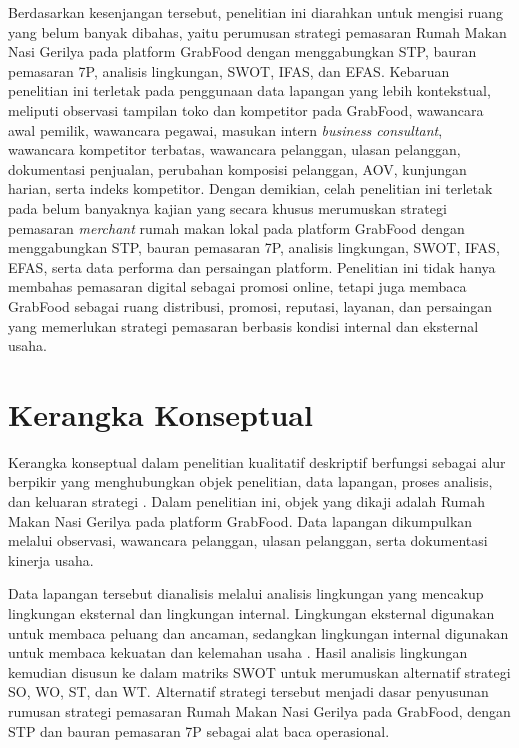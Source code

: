 Berdasarkan kesenjangan tersebut, penelitian ini diarahkan untuk mengisi ruang yang belum banyak dibahas, yaitu perumusan strategi pemasaran Rumah Makan Nasi Gerilya pada platform GrabFood dengan menggabungkan STP, bauran pemasaran 7P, analisis lingkungan, SWOT, IFAS, dan EFAS. Kebaruan penelitian ini terletak pada penggunaan data lapangan yang lebih kontekstual, meliputi observasi tampilan toko dan kompetitor pada GrabFood, wawancara awal pemilik, wawancara pegawai, masukan intern \textit{business consultant}, wawancara kompetitor terbatas, wawancara pelanggan, ulasan pelanggan, dokumentasi penjualan, perubahan komposisi pelanggan, AOV, kunjungan harian, serta indeks kompetitor. Dengan demikian, celah penelitian ini terletak pada belum banyaknya kajian yang secara khusus merumuskan strategi pemasaran \textit{merchant} rumah makan lokal pada platform GrabFood dengan menggabungkan STP, bauran pemasaran 7P, analisis lingkungan, SWOT, IFAS, EFAS, serta data performa dan persaingan platform. Penelitian ini tidak hanya membahas pemasaran digital sebagai promosi online, tetapi juga membaca GrabFood sebagai ruang distribusi, promosi, reputasi, layanan, dan persaingan yang memerlukan strategi pemasaran berbasis kondisi internal dan eksternal usaha.

\section{Kerangka Konseptual}
Kerangka konseptual dalam penelitian kualitatif deskriptif berfungsi sebagai alur berpikir yang menghubungkan objek penelitian, data lapangan, proses analisis, dan keluaran strategi \parencite{creswell2018qualitativeinquiry,miles2020qualitativedata}. Dalam penelitian ini, objek yang dikaji adalah Rumah Makan Nasi Gerilya pada platform GrabFood. Data lapangan dikumpulkan melalui observasi, wawancara pelanggan, ulasan pelanggan, serta dokumentasi kinerja usaha.

Data lapangan tersebut dianalisis melalui analisis lingkungan yang mencakup lingkungan eksternal dan lingkungan internal. Lingkungan eksternal digunakan untuk membaca peluang dan ancaman, sedangkan lingkungan internal digunakan untuk membaca kekuatan dan kelemahan usaha \parencite{david2023strategicmanagement,gurel2017swot}. Hasil analisis lingkungan kemudian disusun ke dalam matriks SWOT untuk merumuskan alternatif strategi SO, WO, ST, dan WT. Alternatif strategi tersebut menjadi dasar penyusunan rumusan strategi pemasaran Rumah Makan Nasi Gerilya pada GrabFood, dengan STP dan bauran pemasaran 7P sebagai alat baca operasional.

